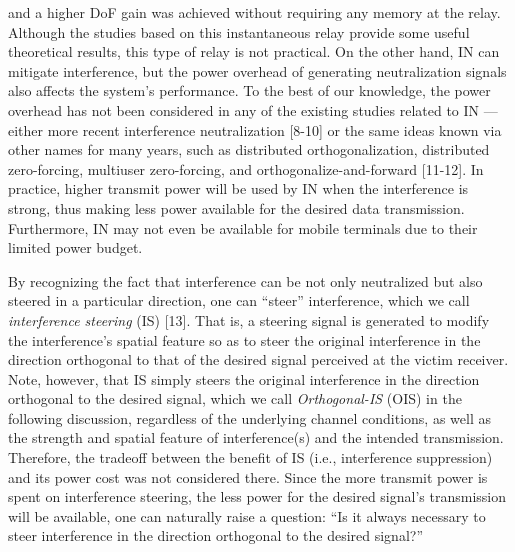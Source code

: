 \documentclass[10pt, conference, letterpaper]{IEEEtran}
\begin{document}
and a higher DoF gain was achieved without requiring any memory at the relay.
Although the studies based on this instantaneous relay provide some useful theoretical results,
this type of relay is not practical.
On the other hand, IN can mitigate interference, but the power overhead of
generating neutralization signals also affects the system's performance.
To the best of our knowledge, the power overhead has not been considered in any of the existing
studies related to IN --- either more recent interference neutralization [8-10] or
the same ideas known via other names for many years, such as distributed orthogonalization,
distributed zero-forcing, multiuser zero-forcing, and orthogonalize-and-forward [11-12].
In practice, higher transmit power will be used by IN when the interference is strong,
thus making less power available for the desired data transmission.
Furthermore, IN may not even be available for mobile terminals due to their limited power budget.

By recognizing the fact that interference can be not only neutralized but also steered in a particular direction,
one can ``steer'' interference, which we call {\em interference steering} (IS) [13].
That is, a steering signal is generated to modify the interference's spatial feature
so as to steer the original interference in the direction orthogonal to that
of the desired signal perceived at the victim receiver.
Note, however, that IS simply steers the original interference in the direction orthogonal
to the desired signal, which we call {\em Orthogonal-IS} (OIS) in the
following discussion, regardless of the underlying channel conditions,
as well as the strength and spatial feature of interference(s) and the intended transmission.
Therefore, the tradeoff between the benefit of IS (i.e., interference suppression) and its power cost
was not considered there.
Since the more transmit power is spent on interference steering,
the less power for the desired signal's transmission will be available,
one can naturally raise a question:
``Is it always necessary to steer interference in the direction orthogonal to the desired signal?''
\end{document}
